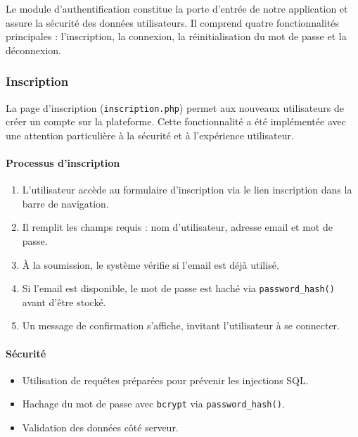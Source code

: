 \documentclass[a4paper,12pt]{article}
\begin{document}
Le module d'authentification constitue la porte d'entrée de notre application et assure la sécurité des données utilisateurs.  
Il comprend quatre fonctionnalités principales : l'inscription, la connexion, la réinitialisation du mot de passe et la déconnexion.

\subsubsection{Inscription}

La page d'inscription (\texttt{inscription.php}) permet aux nouveaux utilisateurs de créer un compte sur la plateforme.  
Cette fonctionnalité a été implémentée avec une attention particulière à la sécurité et à l'expérience utilisateur.

\paragraph{Processus d'inscription}

\begin{enumerate}
  \item L'utilisateur accède au formulaire d'inscription via le lien \og inscription  \fg{} dans la barre de navigation.
  \item Il remplit les champs requis : nom d'utilisateur, adresse email et mot de passe.
  \item À la soumission, le système vérifie si l'email est déjà utilisé.
  \item Si l'email est disponible, le mot de passe est haché via \texttt{password\_hash()} avant d’être stocké.
  \item Un message de confirmation s’affiche, invitant l’utilisateur à se connecter.
\end{enumerate}

\paragraph{Sécurité}

\begin{itemize}
  \item Utilisation de requêtes préparées pour prévenir les injections SQL.
  \item Hachage du mot de passe avec \texttt{bcrypt} via \texttt{password\_hash()}.
  \item Validation des données côté serveur.
\end{itemize}
\end{document}
